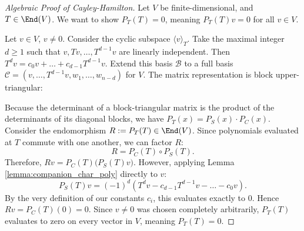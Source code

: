 \begin{proof}[Algebraic Proof of Cayley-Hamilton]
  Let $V$ be finite-dimensional, and $T \in \End(V)$. We want to show $P_T(T) = 0$, meaning $P_T(T)v = 0$ for all $v \in V$.

  Let $v \in V$, $v \neq 0$. Consider the cyclic subspace $\langle v \rangle_T$. Take the maximal integer $d \ge 1$ such that $v, Tv, \dots, T^{d-1}v$ are linearly independent. Then $T^d v = c_0 v + \dots + c_{d-1}T^{d-1}v$.
  Extend this basis $\mathcal{B}$ to a full basis $\mathcal{C} = (v, \dots, T^{d-1}v, w_1, \dots, w_{n-d})$ for $V$. The matrix representation is block upper-triangular:
  \begin{center}
  \end{center}
  Because the determinant of a block-triangular matrix is the product of the determinants of its diagonal blocks, we have $P_T(x) = P_S(x) \cdot P_C(x)$. Consider the endomorphism $R := P_T(T) \in \End(V)$. Since polynomials evaluated at $T$ commute with one another, we can factor $R$:
  \[
  R = P_C(T) \circ P_S(T).
  \]
  Therefore, $Rv = P_C(T) \Big( P_S(T)v \Big)$.
  However, applying Lemma \ref{lemma:companion_char_poly} directly to $v$:
  \[
  P_S(T)v = (-1)^d (T^d v - c_{d-1}T^{d-1}v - \dots - c_0 v).
  \]
  By the very definition of our constants $c_i$, this evaluates exactly to $0$. Hence $Rv = P_C(T)(0) = 0$. Since $v \neq 0$ was chosen completely arbitrarily, $P_T(T)$ evaluates to zero on every vector in $V$, meaning $P_T(T) = 0$.
\end{proof}

